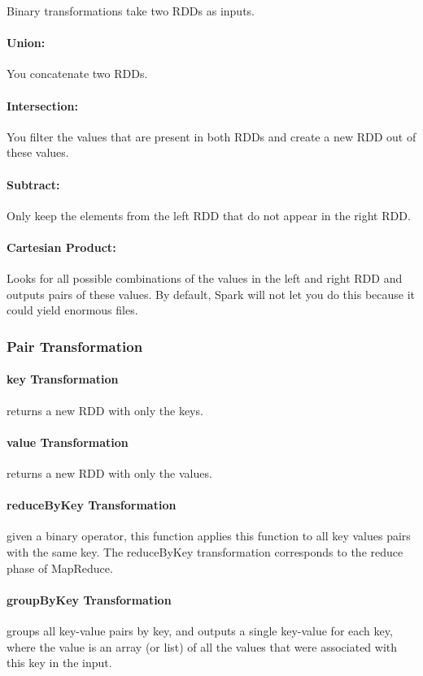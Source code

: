 Binary transformations take two RDDs as inputs.

\paragraph{Union:} You concatenate two RDDs.

\paragraph{Intersection:} You filter the values that are present in both RDDs and create a new RDD out of these values.

\paragraph{Subtract:} Only keep the elements from the left RDD that do not appear in the right RDD.

\paragraph{Cartesian Product:} Looks for all possible combinations of the values in the left and right RDD and outputs pairs of these values. By default, Spark will not let you do this because it could yield enormous files.

\subsubsection{Pair Transformation}

\paragraph{key Transformation} returns a new RDD with only the keys.

\paragraph{value Transformation} returns a new RDD with only the values.

\paragraph{reduceByKey Transformation} given a binary operator, this function applies this function to all key values pairs with the same key. The reduceByKey transformation corresponds to the reduce phase of MapReduce.

\paragraph{groupByKey Transformation}  groups all key-value pairs by key, and outputs a single key-value for each key, where the value is an array (or list) of all the values that were associated with this key in the input.

